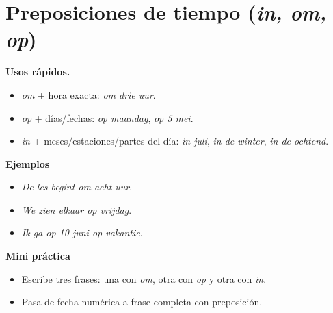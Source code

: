 \section{Preposiciones de tiempo (\textit{in, om, op})}
\textbf{Usos rápidos.}
\begin{itemize}[leftmargin=*]
  \item \textit{om} + hora exacta: \textit{om drie uur}.
  \item \textit{op} + días/fechas: \textit{op maandag}, \textit{op 5 mei}.
  \item \textit{in} + meses/estaciones/partes del día: \textit{in juli}, \textit{in de winter}, \textit{in de ochtend}.
\end{itemize}

\textbf{Ejemplos}
\begin{itemize}[leftmargin=*]
  \item \textit{De les begint om acht uur}.
  \item \textit{We zien elkaar op vrijdag}.
  \item \textit{Ik ga op 10 juni op vakantie}.
\end{itemize}

\textbf{Mini práctica}
\begin{itemize}[leftmargin=*]
  \item Escribe tres frases: una con \textit{om}, otra con \textit{op} y otra con \textit{in}.
  \item Pasa de fecha numérica a frase completa con preposición.
\end{itemize}
